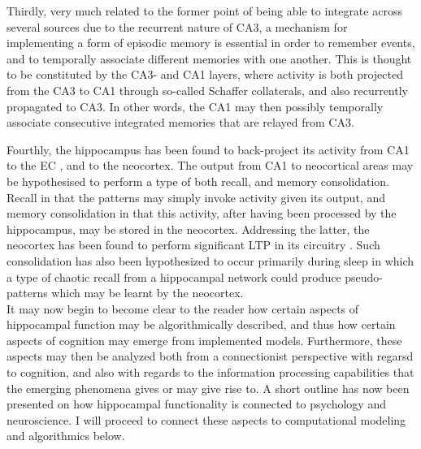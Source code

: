 Thirdly, very much related to the former point of being able to integrate across several sources due to the recurrent nature of CA3, a mechanism for implementing a form of episodic memory is essential in order to remember events, and to temporally associate different memories with one another. This is thought to be constituted by the CA3- and CA1 layers, where activity is both projected from the CA3 to CA1 through so-called Schaffer collaterals, and also recurrently propagated to CA3. In other words, the CA1 may then possibly temporally associate consecutive integrated memories that are relayed from CA3.

Fourthly, the hippocampus has been found to back-project its activity from CA1 to the EC \citep{Rolls1998chpt6}, and to the neocortex. The output from CA1 to neocortical areas may be hypothesised to perform a type of both recall, and memory consolidation. Recall in that the patterns may simply invoke activity given its output, and memory consolidation in that this activity, after having been processed by the hippocampus, may be stored in the neocortex. Addressing the latter, the neocortex has been found to perform significant LTP in its circuitry \citep{Rolls1998chpt6}. Such consolidation has also been hypothesized to occur primarily during sleep \citep{French2001} in which a type of chaotic recall from a hippocampal network could produce pseudo-patterns which may be learnt by the neocortex.
\\


It may now begin to become clear to the reader how certain aspects of hippocampal function may be algorithmically described, and thus how certain aspects of cognition may emerge from implemented models. Furthermore, these aspects may then be analyzed both from a connectionist perspective with regarsd to cognition, and also with regards to the information processing capabilities that the emerging phenomena gives or may give rise to. A short outline has now been presented on how hippocampal functionality is connected to psychology and neuroscience. I will proceed to connect these aspects to computational modeling and algorithmics below.


